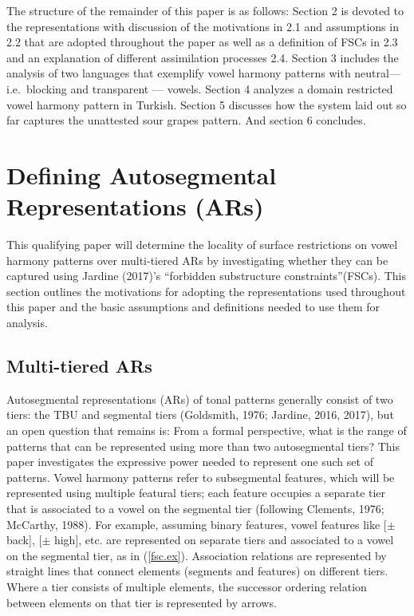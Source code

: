 \documentclass[,doc,floatsintext]{apa6}
\theoremstyle{definition}
\theoremstyle{definition}
\theoremstyle{definition}
\theoremstyle{remark}
\begin{document}
The structure of the remainder of this paper is as follows: Section 2 is
devoted to the representations with discussion of the motivations in 2.1
and assumptions in 2.2 that are adopted throughout the paper as well as
a definition of FSCs in 2.3 and an explanation of different assimilation
processes 2.4. Section 3 includes the analysis of two languages that
exemplify vowel harmony patterns with neutral--- i.e.~blocking and
transparent --- vowels. Section 4 analyzes a domain restricted vowel
harmony pattern in Turkish. Section 5 discusses how the system laid out
so far captures the unattested sour grapes pattern. And section 6
concludes.

\section{Defining Autosegmental Representations
(ARs)}\label{defining-autosegmental-representations-ars}

This qualifying paper will determine the locality of surface
restrictions on vowel harmony patterns over multi-tiered ARs by
investigating whether they can be captured using Jardine (2017)'s
\enquote{forbidden substructure constraints}(FSCs). This section
outlines the motivations for adopting the representations used
throughout this paper and the basic assumptions and definitions needed
to use them for analysis.

\subsection{Multi-tiered ARs}\label{multi-tiered-ars}

Autosegmental representations (ARs) of tonal patterns generally consist
of two tiers: the TBU and segmental tiers (Goldsmith, 1976; Jardine,
2016, 2017), but an open question that remains is: From a formal
perspective, what is the range of patterns that can be represented using
more than two autosegmental tiers? This paper investigates the
expressive power needed to represent one such set of patterns. Vowel
harmony patterns refer to subsegmental features, which will be
represented using multiple featural tiers; each feature occupies a
separate tier that is associated to a vowel on the segmental tier
(following Clements, 1976; McCarthy, 1988). For example, assuming binary
features, vowel features like {[}\(\pm\) back{]}, {[}\(\pm\) high{]},
etc. are represented on separate tiers and associated to a vowel on the
segmental tier, as in (\ref{fsc.ex}). Association relations are
represented by straight lines that connect elements (segments and
features) on different tiers. Where a tier consists of multiple
elements, the successor ordering relation between elements on that tier
is represented by arrows.
\end{document}
